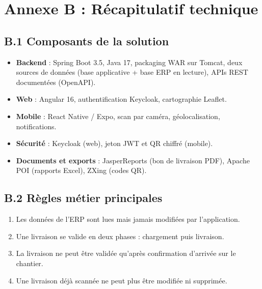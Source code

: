 \documentclass[12pt,a4paper]{report}
\begin{document}
\section*{Annexe B : Récapitulatif technique}

\subsection*{B.1 Composants de la solution}

\begin{itemize}
\item \textbf{Backend} : Spring Boot 3.5, Java 17, packaging WAR sur Tomcat, deux sources de données (base applicative + base ERP en lecture), APIs REST documentées (OpenAPI).
\item \textbf{Web} : Angular 16, authentification Keycloak, cartographie Leaflet.
\item \textbf{Mobile} : React Native / Expo, scan par caméra, géolocalisation, notifications.
\item \textbf{Sécurité} : Keycloak (web), jeton JWT et QR chiffré (mobile).
\item \textbf{Documents et exports} : JasperReports (bon de livraison PDF), Apache POI (rapports Excel), ZXing (codes QR).
\end{itemize}

\subsection*{B.2 Règles métier principales}

\begin{enumerate}
\item Les données de l'ERP sont lues mais jamais modifiées par l'application.
\item Une livraison se valide en deux phases : chargement puis livraison.
\item La livraison ne peut être validée qu'après confirmation d'arrivée sur le chantier.
\item Une livraison déjà scannée ne peut plus être modifiée ni supprimée.
\end{enumerate}
\end{document}
